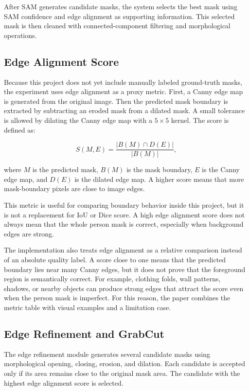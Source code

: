 \documentclass[conference]{IEEEtran}
\begin{document}
After SAM generates candidate masks, the system selects the best mask using SAM confidence and edge alignment as supporting information. This selected mask is then cleaned with connected-component filtering and morphological operations.

\subsection{Edge Alignment Score}
Because this project does not yet include manually labeled ground-truth masks, the experiment uses edge alignment as a proxy metric. First, a Canny edge map is generated from the original image. Then the predicted mask boundary is extracted by subtracting an eroded mask from a dilated mask. A small tolerance is allowed by dilating the Canny edge map with a $5 \times 5$ kernel. The score is defined as:

\begin{equation}
S(M,E) = \frac{|B(M) \cap D(E)|}{|B(M)|},
\end{equation}

where $M$ is the predicted mask, $B(M)$ is the mask boundary, $E$ is the Canny edge map, and $D(E)$ is the dilated edge map. A higher score means that more mask-boundary pixels are close to image edges.

This metric is useful for comparing boundary behavior inside this project, but it is not a replacement for IoU or Dice score. A high edge alignment score does not always mean that the whole person mask is correct, especially when background edges are strong.

The implementation also treats edge alignment as a relative comparison instead of an absolute quality label. A score close to one means that the predicted boundary lies near many Canny edges, but it does not prove that the foreground region is semantically correct. For example, clothing folds, wall patterns, shadows, or nearby objects can produce strong edges that attract the score even when the person mask is imperfect. For this reason, the paper combines the metric table with visual examples and a limitation case.

\subsection{Edge Refinement and GrabCut}
The edge refinement module generates several candidate masks using morphological opening, closing, erosion, and dilation. Each candidate is accepted only if its area remains close to the original mask area. The candidate with the highest edge alignment score is selected.
\end{document}
